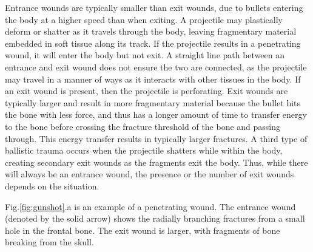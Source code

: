\documentclass[titlepage]{article}
\begin{document}
Entrance wounds are typically smaller than exit wounds, due to bullets entering the body at a higher speed than when exiting. A projectile may plastically deform or shatter as it travels through the body, leaving fragmentary material embedded in soft tissue along its track. If the projectile results in a penetrating wound, it will enter the body but not exit. A straight line path between an entrance and exit wound does not ensure the two are connected, as the projectile may travel in a manner of ways as it interacts with other tissues in the body.\cite{ballistic-trauma} If an exit wound is present, then the projectile is perforating. Exit wounds are typically larger and result in more fragmentary material because the bullet hits the bone with less force, and thus has a longer amount of time to transfer energy to the bone before crossing the fracture threshold of the bone and passing through. This energy transfer results in typically larger fractures. A third type of ballistic trauma occurs when the projectile shatters while within the body, creating secondary exit wounds as the fragments exit the body. Thus, while there will always be an entrance wound, the presence or the number of exit wounds depends on the situation.

Fig.\ref{fig:gunshot}.a is an example of a penetrating wound. The entrance wound (denoted by the solid arrow) shows the radially branching fractures from a small hole in the frontal bone. The exit wound is larger, with fragments of bone breaking from the skull.
\end{document}
